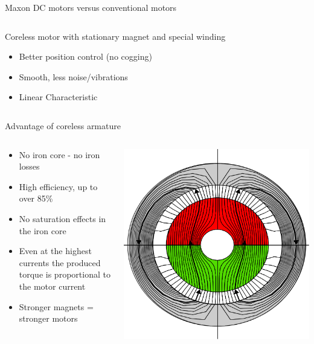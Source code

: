 \documentclass[compress]{beamer}
\begin{document}
\begin{frame}{Maxon DC motors versus conventional motors}
\begin{columns}
\begin{column}{0.5\linewidth}
Coreless motor with stationary magnet and special winding

\begin{itemize}
    \item Better position control (no cogging)
    \item Smooth, less noise/vibrations
    \item Linear Characteristic
\end{itemize}

        \end{column}
    \end{columns}

\end{frame}

\begin{frame}{Advantage of coreless armature}

\begin{columns}
    \begin{column}{0.6\linewidth}

\begin{itemize}

\item No iron core - no iron losses
\item High efficiency, up to over 85\%
\item No saturation effects in the iron core
\item Even at the highest currents the produced torque is proportional to
  the motor current
\item Stronger magnets = stronger motors
\end{itemize}

    \end{column}
    \begin{column}{0.4\linewidth}

        \begin{center}
            \includegraphics[width=0.8\columnwidth]{maxon_stator}
        \end{center}
    \end{column}
\end{columns}


\end{frame}
\end{document}
